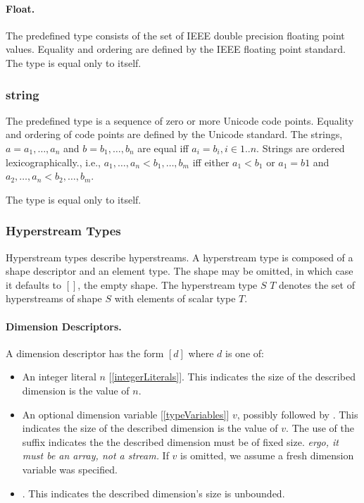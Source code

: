 \documentclass{article}
\begin{document}
 \paragraph{Float.} The predefined type \FLOAT{} consists of the set of IEEE double precision floating point values.  Equality and ordering are defined by the IEEE floating point standard.  The type \FLOAT{} is equal only to itself.
 

 
\subsubsection{string}
\label{string}

The predefined type \STRING{} is a sequence of zero or more Unicode code points. Equality and ordering of code points are defined by the Unicode standard. 
The strings, $a = a_1, \ldots, a_n$ and $b = b_1, \ldots, b_n$ are equal iff $a_i = b_i, i \in 1..n$. Strings are ordered lexicographically., i.e., $a_1, \ldots, a_n < b_1, \ldots, b_m$ iff  either $a_1 < b_1$ or $a_1 = b1$ and $a_2, \ldots, a_n < b_2, \ldots, b_m$.

The type \STRING{} is equal only to itself. 

\subsubsection{Hyperstream Types}
\label{hyperstreamTypes}

Hyperstream types describe hyperstreams. A hyperstream type is composed of a shape descriptor and an element type. The shape may be omitted, in which case it defaults to $[]$, the empty shape. The hyperstream type $S$ $T$ denotes the set of hyperstreams of shape $S$ with elements of scalar type $T$.

\paragraph{Dimension Descriptors.}
A dimension descriptor has the form $[d]$ where $d$ is one of:
\begin{itemize}
\item An integer literal $n$ [\ref{integerLiterals}]. This indicates the size of the described dimension is the value of $n$.
\item An optional dimension variable [\ref{typeVariables}] $v$, possibly followed by \BANG. This indicates the size of the described dimension is the value of $v$.
The use of the \BANG{} suffix indicates the the described  dimension must be of fixed size. 
{\em ergo, it must be an array, not a stream.}
If $v$ is omitted, we assume a fresh dimension variable was specified. 
\item  \QUESTIONMARK. This indicates the described dimension's size is unbounded.
 \end{itemize}
 
\end{document}
